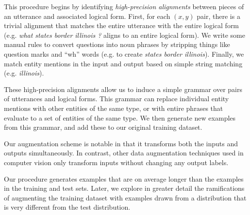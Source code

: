 \documentclass[11pt,letterpaper]{article}
\newcommand\nl[1]{\textit{#1}}
\newcommand\rj[1]{\textcolor{blue}{[RJ: #1]}}
\renewcommand\rj[1]{}
\begin{document}
This procedure begins by identifying \emph{high-precision alignments}
between pieces of an utterance and associated logical form.
First, for each $(x, y)$ pair, there is a trivial alignment that
matches the entire utterance with the entire logical form
(e.g. \nl{what states border illinois ?} aligns to an entire logical form).
We write some manual rules to convert questions into noun phrases
by stripping things like question marks and ``wh'' words
(e.g. to create \nl{states border illinois}).
Finally, we match entity mentions in the 
input and output based on simple string matching (e.g. \nl{illinois}).

These high-precision alignments allow us to
induce a simple grammar over pairs of utterances and logical forms.
This grammar can replace individual entity mentions with
other entities of the same type,
or with entire phrases that evaluate to a set of entities of the same type.
We then generate new examples from this grammar,
and add these to our original training dataset.

Our augmentation scheme is notable in that it 
transforms both the inputs and outputs simultaneously.
In contrast, other data augmentation techniques used in computer vision
\cite{krizhevsky2012imagenet}
only transform inputs without changing any output labels.

Our procedure generates examples that are on average
longer than the examples in the training and test sets.
Later, we explore in greater detail the ramifications of augmenting the training dataset
with examples drawn from a distribution that is very different from the test distribution.
\rj{Need to point this out first here, but leave main discussion to experiments section}
\end{document}
